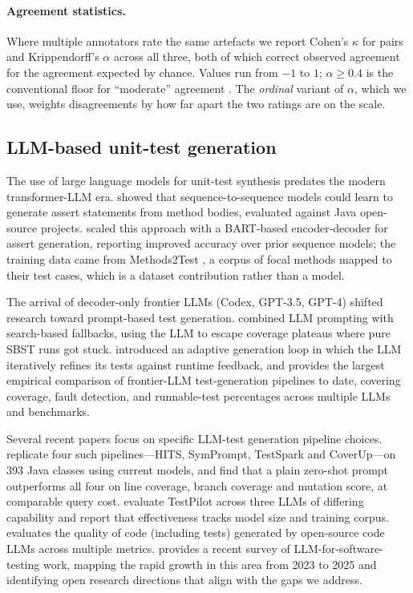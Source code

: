 \documentclass[smallextended]{svjour3}
\begin{document}
\paragraph{Agreement statistics.} Where multiple annotators rate the
same artefacts we report Cohen's $\kappa$ for pairs and
Krippendorff's $\alpha$ \citep{krippendorff2018} across all three,
both of which correct observed agreement for the agreement expected
by chance. Values run from $-1$ to $1$; $\alpha \geq 0.4$ is the
conventional floor for ``moderate'' agreement \citep{landis1977}. The
\emph{ordinal} variant of $\alpha$, which we use, weights
disagreements by how far apart the two ratings are on the scale.

\subsection{LLM-based unit-test generation}\label{sec:related-llmtg}
The use of large language models for unit-test synthesis predates
the modern transformer-LLM era. \citet{watson2020} showed that
sequence-to-sequence models could learn to generate assert
statements from method bodies, evaluated against Java open-source
projects. \citet{tufano2022assert} scaled this approach with a BART-based
encoder-decoder for assert generation, reporting improved accuracy
over prior sequence models; the training data came from
Methods2Test \citep{tufano2022}, a corpus of focal methods mapped to
their test cases, which is a dataset contribution rather than a
model.

The arrival of decoder-only frontier LLMs (Codex, GPT-3.5, GPT-4)
shifted research toward prompt-based test generation.
\citet{lemieux2023codamosa} combined LLM prompting with
search-based fallbacks, using the LLM to escape coverage plateaus
where pure SBST runs got stuck. \citet{schafer2024} introduced an adaptive generation loop in which the LLM iteratively refines its tests against runtime feedback, and provides the largest empirical comparison of frontier-LLM
test-generation pipelines to date, covering coverage, fault
detection, and runnable-test percentages across multiple LLMs and
benchmarks.

Several recent papers focus on specific LLM-test
generation pipeline choices. \citet{konstantinou2026newer} replicate
four such pipelines---HITS, SymPrompt, TestSpark and CoverUp---on
393 Java classes using current models, and find that a plain
zero-shot prompt outperforms all four on line coverage, branch
coverage and mutation score, at comparable query cost.
\citet{schafer2024} evaluate TestPilot across three LLMs of
differing capability and report that effectiveness tracks model
size and training corpus. 
\citet{siddiq2024junit} evaluates the quality of code (including
tests) generated by open-source code LLMs across multiple metrics.
\citet{wang2025llm4se} provides a recent survey of
LLM-for-software-testing work, mapping the rapid growth in this
area from 2023 to 2025 and identifying open research directions
that align with the gaps we address.
\end{document}
